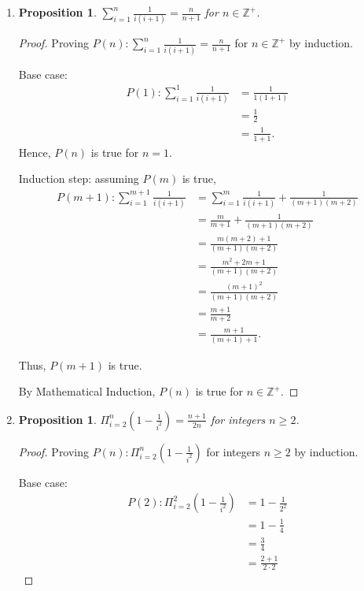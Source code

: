 \documentclass{article}
\newtheorem{prop}[thm]{Proposition}
\begin{document}
\begin{enumerate}[label={(\arabic*)}]
\item 
\begin{prop}
    $\sum_{i=1}^{n}\frac{1}{i(i+1)} =  \frac{n}{n+1}$ for $n \in \mathbb{Z}^+$.
\end{prop}
\begin{proof}
    Proving $P(n): \sum_{i=1}^{n}\frac{1}{i(i+1)} =  \frac{n}{n+1}$ for $n \in \mathbb{Z}^+$ by induction.

    Base case:
    \begin{align}
        P(1): \sum_{i=1}^{1}\frac{1}{i(i+1)} & = \frac{1}{1(1+1)} \\
        & = \frac{1}{2} \\
        & = \frac{1}{1+1}.
    \end{align}
    Hence, $P(n)$ is true for $n=1$.

    Induction step: assuming $P(m)$ is true,
    \begin{align}
        P(m+1): \sum_{i=1}^{m+1}\frac{1}{i(i+1)} & = \sum_{i=1}^{m}\frac{1}{i(i+1)} + \frac{1}{(m+1)(m+2)} \\
        & = \frac{m}{m+1} + \frac{1}{(m+1)(m+2)} \\
        & = \frac{m(m+2) + 1}{(m+1)(m+2)} \\ 
        & = \frac{m^2 + 2m + 1}{(m+1)(m+2)} \\
        & = \frac{(m+1)^2}{(m+1)(m+2)} \\
        & = \frac{m+1}{m+2} \\ 
        & = \frac{m+1}{(m+1)+1}.
    \end{align}

    Thus, $P(m+1)$ is true.

    By Mathematical Induction, $P(n)$ is true for $n \in \mathbb{Z}^+$.
\end{proof}

\item 
\begin{prop}
    $\Pi_{i=2}^n\left(1 - \frac{1}{i^2}\right) = \frac{n+1}{2n}$ for integers $n \ge 2$.
\end{prop}
\begin{proof}
    Proving $P(n): \Pi_{i=2}^n\left(1-\frac{1}{i^2}\right)$ for integers $n \ge 2$ by induction.

    Base case:
    \begin{align}
        P(2): \Pi_{i=2}^2\left(1-\frac{1}{i^2}\right) & = 1 - \frac{1}{2^2} \\
        & = 1 - \frac{1}{4} \\ 
        & = \frac{3}{4} \\
        & = \frac{2 + 1}{2 \cdot 2}
    \end{align}


\end{proof}
\end{enumerate}
\end{document}
